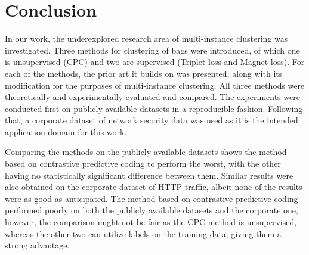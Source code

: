 \section{Conclusion}

In our work, the underexplored research area of multi-instance clustering was investigated. Three methods for clustering of bags were introduced, of which one is unsupervised (CPC) and two are supervised (Triplet loss and Magnet loss). For each of the methods, the prior art it builds on was presented, along with its modification for the purposes of multi-instance clustering. All three methods were theoretically and experimentally evaluated and compared. The experiments were conducted first on publicly available datasets in a reproducible fashion. Following that, a corporate dataset of network security data was used as it is the intended application domain for this work.

Comparing the methods on the publicly available datasets shows the method based on contrastive predictive coding to perform the worst, with the other having no statistically significant difference between them. Similar results were also obtained on the corporate dataset of HTTP traffic, albeit none of the results were as good as anticipated. The method based on contrastive predictive coding performed poorly on both the publicly available datasets and the corporate one, however, the comparison might not be fair as the CPC method is unsupervised, whereas the other two can utilize labels on the training data, giving them a strong advantage.
